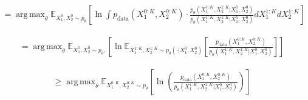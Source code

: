 \documentclass[11pt]{article}
\DeclareMathOperator*{\argmax}{arg\,max}
\begin{document}
\begin{align}
= \argmax_\theta \mathbb{E}_{X_1^0, X_2^0 \sim p_\theta} \left[ \ln \int p_{\text{data}}(X_1^{0:K}, X_2^{0:K}) \cdot \frac{p_\theta(X_1^{1:K}, X_2^{1:K} | X_1^0, X_2^0)}{p_\theta(X_1^{1:K}, X_2^{1:K} | X_1^0, X_2^0)} dX_1^{1:K} dX_2^{1:K} \right]
\end{align}

\begin{align}
= \argmax_\theta \mathbb{E}_{X_1^0, X_2^0 \sim p_\theta, } \left[ \ln \mathbb{E}_{X_1^{1:K}, X_2^{1:K} \sim p_\theta(\cdot | X_1^0, X_2^0)} \left[ \frac{p_{\text{data}}(X_1^{0:K}, X_2^{0:K})}{p_\theta(X_1^{1:K}, X_2^{1:K} | X_1^0, X_2^0)} \right] \right]
\end{align}

\begin{align}
\geq \argmax_\theta \mathbb{E}_{X_1^{0:K}, X_2^{0:K} \sim p_\theta} \left[ \ln \left( \frac{p_{\text{data}}(X_1^{0:K}, X_2^{0:K})}{p_\theta(X_1^{1:K}, X_2^{1:K} | X_1^0, X_2^0)} \right) \right]
\end{align}
\end{document}
